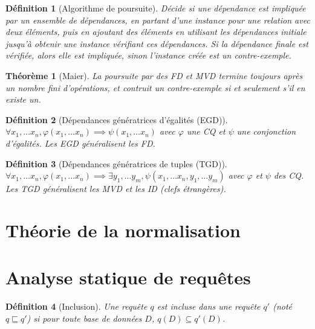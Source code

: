 \documentclass[landscape]{article}
\newcommand{\1}{\mathbbm{1}}
\newcommand{\0}{\mathbbm{0}}
\renewcommand{\phi}{\varphi}
\newtheorem{theo}{Théorème}
\newtheorem{defi}{Définition}
\begin{document}
\begin{multicols}{2}
    \begin{defi}[Algorithme de poursuite]
        Décide si une dépendance est impliquée par un ensemble de dépendances, en
        partant d'une instance pour une relation avec deux éléments, puis en ajoutant
        des éléments en utilisant les dépendances initiale jusqu'à obtenir une instance
        vérifiant ces dépendances. Si la dépendance finale est vérifiée, alors
        elle est impliquée, sinon l'instance créée est un contre-exemple.
    \end{defi}

    \begin{theo}[Maier]
        La poursuite par des FD et MVD termine toujours après un nombre fini
        d'opérations, et contruit un contre-exemple si et seulement s'il en
        existe un.
    \end{theo}

    \begin{defi}[Dépendances génératrices d'égalités (EGD)]
        $\forall x_1,\ldots x_n, \phi(x_1,\ldots x_n)\implies \psi(x_1,\ldots x_n)$
        avec $\phi$ une CQ et $\psi$ une conjonction d'égalités. Les EGD généralisent
        les FD.
    \end{defi}

    \begin{defi}[Dépendances génératrices de tuples (TGD)]
        $\forall x_1,\ldots x_n, \phi(x_1,\ldots x_n)\implies\exists y_1,\ldots y_m, \psi(x_1,\ldots x_n, y_1, \ldots y_m)$
        avec $\phi$ et $\psi$ des CQ. Les TGD généralisent les MVD et les ID
        (clefs étrangères).
    \end{defi}


    \section{Théorie de la normalisation}
    

    \section{Analyse statique de requêtes}

    \begin{defi}[Inclusion]
        Une requête $q$ est incluse dans une requête $q'$ (noté $q\sqsubseteq q'$)
        si pour toute base de données $D$, $q(D)\subseteq q'(D)$.
    \end{defi}


\end{multicols}
\end{document}
